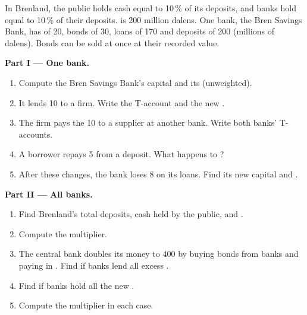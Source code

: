 \begin{problem}
\label{pb:g11:money-and-banking:1}
In Brenland, the public holds cash equal to 10\,\% of its deposits, and banks hold  equal to 10\,\% of their deposits.  is 200 million dalens.
One bank, the Bren Savings Bank, has  of 20, bonds of 30, loans of 170 and deposits of 200 (millions of dalens). Bonds can be sold at once at their recorded value.

\medskip
\noindent\textbf{Part I --- One bank.}
\begin{enumerate}
\item Compute the Bren Savings Bank's capital and its  (unweighted).
\item It lends 10 to a firm. Write the T-account and the new .
\item The firm pays the 10 to a supplier at another bank. Write both banks' T-accounts.
\item A borrower repays 5 from a deposit. What happens to ?
\item After these changes, the bank loses 8 on its loans. Find its new capital and .
\end{enumerate}

\medskip
\noindent\textbf{Part II --- All banks.}
\begin{enumerate}[resume]
\item Find Brenland's total deposits, cash held by the public,  and .
\item Compute the multiplier.
\item The central bank doubles its money to 400 by buying bonds from banks and paying in . Find  if banks lend all excess .
\item Find  if banks hold all the new .
\item Compute the multiplier in each case.
\end{enumerate}


\end{problem}
